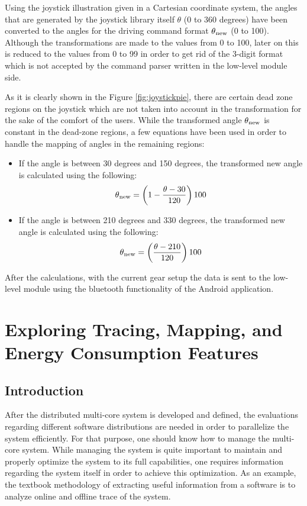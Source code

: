 Using the joystick illustration given in a Cartesian coordinate system, the angles that are generated by the joystick library itself $\theta$ (0 to 360 degrees) have been converted to the angles for the driving command format $\theta\textsubscript{new}$ (0 to 100). Although the transformations are made to the values from 0 to 100, later on this is reduced to the values from 0 to 99 in order to get rid of the 3-digit format which is not accepted by the command parser written in the low-level module side.

As it is clearly shown in the Figure \ref{fig:joystickpie}, there are certain dead zone regions on the joystick which are not taken into account in the transformation for the sake of the comfort of the users. While the transformed angle $\theta\textsubscript{new}$ is  constant in the dead-zone regions, a few equations have been used in order to handle the mapping of angles in the remaining regions:
\begin{itemize}
	\item If the angle is between 30 degrees and 150 degrees, the transformed new angle is calculated using the following:
	\begin{equation}
	\theta\textsubscript{new}=\left(1 - \frac{\theta - 30}{120}\right) 100
	\end{equation}
	\item If the angle is between 210 degrees and 330 degrees, the transformed new angle is calculated using the following:
	\begin{equation}
	\theta\textsubscript{new}=\left(\frac{\theta - 210}{120}\right) 100
	\end{equation} 
\end{itemize}
After the calculations, with the current gear setup the data is sent to the low-level module using the bluetooth functionality of the Android application.
\newpage
\section{Exploring Tracing, Mapping, and Energy Consumption Features}
\subsection{Introduction}
After the distributed multi-core system is developed and defined, the evaluations regarding different software distributions are needed in order to parallelize the system efficiently. For that purpose, one should know how to manage the multi-core system. While managing the system is quite important to maintain and properly optimize the system to its full capabilities, one requires information regarding the system itself in order to achieve this optimization. As an example, the textbook methodology of extracting useful information from a software is to analyze online and offline trace of the system. 

